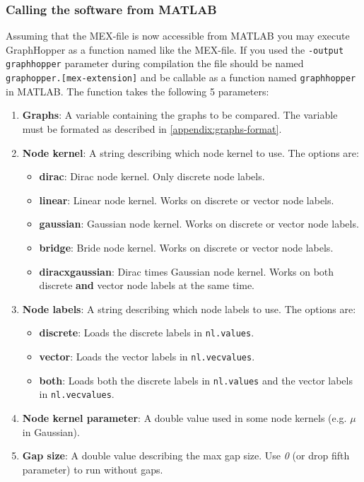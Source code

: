 \documentclass{article}
\begin{document}
\begin{appendices}
\subsubsection{Calling the software from MATLAB}
Assuming that the MEX-file is now accessible from MATLAB you may execute GraphHopper as a function named like the MEX-file. If you used the \verb|-output graphhopper| parameter during compilation the file should be named \verb|graphopper.[mex-extension]| and be callable as a function named \verb|graphhopper| in MATLAB. The function takes the following 5 parameters:
\begin{enumerate}
	\item \textbf{Graphs}: A variable containing the graphs to be compared. The variable must be formated as described in \ref{appendix:graphs-format}.
	\item \textbf{Node kernel}: A string describing which node kernel to use. The options are:
	\begin{itemize}
		\item \textbf{dirac}: Dirac node kernel. Only discrete node labels.
		\item \textbf{linear}: Linear node kernel. Works on discrete or vector node labels.
		\item \textbf{gaussian}: Gaussian node kernel. Works on discrete or vector node labels.
		\item \textbf{bridge}: Bride node kernel. Works on discrete or vector node labels.
		\item \textbf{diracxgaussian}: Dirac times Gaussian node kernel. Works on both discrete \textbf{and} vector node labels at the same time.
	\end{itemize}
	\item \textbf{Node labels}: A string describing which node labels to use. The options are:
	\begin{itemize}
		\item \textbf{discrete}: Loads the discrete labels in \verb|nl.values|.
		\item \textbf{vector}: Loads the vector labels in \verb|nl.vecvalues|.
		\item \textbf{both}: Loads both the discrete labels in \verb|nl.values| and the vector labels in \verb|nl.vecvalues|.
	\end{itemize}
	\item \textbf{Node kernel parameter}: A double value used in some node kernels (e.g. $\mu$ in Gaussian).
	\item \textbf{Gap size}: A double value describing the max gap size. Use \textit{0} (or drop fifth parameter) to run without gaps.
\end{enumerate}


\end{appendices}
\end{document}
